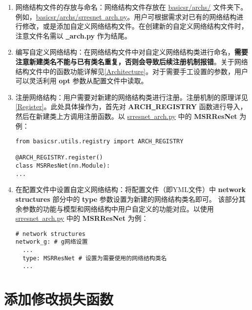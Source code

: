 \documentclass[../main.tex]{subfiles}
\begin{document}
\begin{enumerate}
    \item 网络结构文件的存放与命名：网络结构文件存放在 \href{https://github.com/XPixelGroup/BasicSR/tree/master/basicsr/archs}{basicsr/archs/} 文件夹下。例如，\href{https://github.com/XPixelGroup/BasicSR/tree/master/basicsr/archs}{basicsr/archs/srresnet\underline{~}arch.py}。用户可根据需求对已有的网络结构进行修改，或是添加自定义网络结构文件。在创建新的自定义网络结构文件时，注意文件名需以  \textbf{\underline{~}arch.py} 作为结尾。

    \item 编写自定义网络结构：在网络结构文件中对自定义网络结构类进行命名，\textbf{需要注意新建类名不能与已有类名重复，否则会导致后续注册机制报错}。关于网络结构文件中的函数功能详解见\ref{Architecture}。对于需要手工设置的参数，用户可以灵活利用 \textbf{opt} 参数从配置文件中读取。

    \item 注册网络结构：用户需要对新建的网络结构类进行注册。注册机制的原理详见\ref{Register}。此处具体操作为，首先对 \textbf{ARCH\underline{~}REGISTRY} 函数进行导入，然后在新建类上方调用注册函数。以 \href{https://github.com/XPixelGroup/BasicSR/tree/master/basicsr/archs/srresnet_arch.py}{srresnet\underline{~}arch.py} 中的 \textbf{MSRResNet} 为例：
          \begin{verbatim}
from basicsr.utils.registry import ARCH_REGISTRY

@ARCH_REGISTRY.register()
class MSRResNet(nn.Module):
...
\end{verbatim}

    \item 在配置文件中设置自定义网络结构：将配置文件（即YML文件）中 \textbf{network structures} 部分中的 \textbf{type} 参数设置为新建的网络结构类名即可。
          该部分其余参数的功能与模型和网络结构中用户自定义的功能对应。以使用 \href{https://github.com/XPixelGroup/BasicSR/tree/master/basicsr/archs/srresnet_arch.py}{srresnet\underline{~}arch.py} 中的 \textbf{MSRResNet} 为例：
          \begin{verbatim}
# network structures
network_g: # g网络设置
  ...
  type: MSRResNet # 设置为需要使用的网络结构类名
  ...
\end{verbatim}
\end{enumerate}

\section{添加修改损失函数}\label{howto:add_loss}
\end{document}
